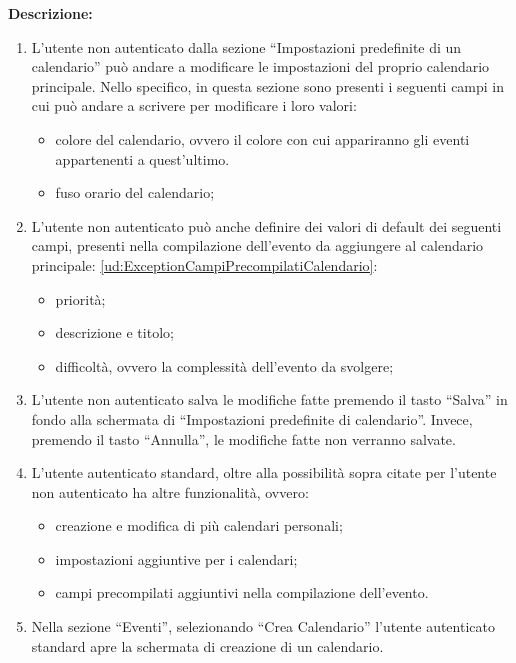 \begin{listaPersonale}[UC]{}
    \textbf{Descrizione:}
    \begin{enumerate}
        \item L'utente non autenticato dalla sezione  “Impostazioni predefinite di un calendario” può andare a modificare le impostazioni del proprio calendario principale. Nello specifico, in questa sezione sono presenti i seguenti campi in cui può andare a scrivere per modificare i loro valori:
              \begin{itemize}
                  \item colore del calendario, ovvero il colore con cui appariranno gli eventi appartenenti a quest'ultimo.
                  \item fuso orario del calendario;
              \end{itemize}
        \item L'utente non autenticato può anche definire dei valori di default dei seguenti campi, presenti nella compilazione dell'evento da aggiungere al calendario principale: \ref{ud:ExceptionCampiPrecompilatiCalendario}:
              \begin{itemize}
                  \item priorità;
                  \item descrizione e titolo;
                  \item difficoltà, ovvero la complessità dell'evento da svolgere;
              \end{itemize}
        \item L'utente non autenticato salva le modifiche fatte premendo il tasto “Salva” in fondo alla schermata di “Impostazioni predefinite di calendario”. Invece, premendo il tasto “Annulla”, le modifiche fatte non verranno salvate.
        \item L'utente autenticato standard, oltre alla possibilità sopra citate per l'utente non autenticato ha altre funzionalità, ovvero:
              \begin{itemize}
                  \item creazione e modifica di più calendari personali;
                  \item impostazioni aggiuntive per i calendari;
                  \item campi precompilati aggiuntivi nella compilazione dell'evento.
              \end{itemize}
        \item Nella sezione “Eventi”, selezionando “Crea Calendario” l'utente autenticato standard apre la schermata di creazione di un calendario.

\end{enumerate}
\end{listaPersonale}
